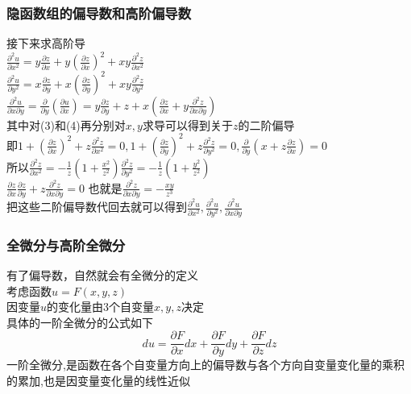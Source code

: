 \documentclass[xetex]{beamer}
\begin{document}
\begin{frame}
	\frametitle{隐函数组的偏导数和高阶偏导数}
	接下来求高阶导\\
	$\frac{\partial^2 u}{\partial x^2}=y\frac{\partial z}{\partial x}+y(\frac{\partial z}{\partial x})^2+xy\frac{\partial^2 z}{\partial x^2}$\\ \pause
	$\frac{\partial^2 u}{\partial y^2}=x\frac{\partial z}{\partial y}+x(\frac{\partial z}{\partial y})^2+xy\frac{\partial^2 z}{\partial y^2}$\\ \pause
	$\frac{\partial^2 u}{\partial x\partial y}=\frac{\partial }{\partial y}(\frac{\partial u}{\partial x})=y\frac{\partial z}{\partial y}+z+x(\frac{\partial z}{\partial x}+y\frac{\partial^2 z}{\partial x\partial y})$\\ \pause
	其中对(3)和(4)再分别对$x,y$求导可以得到关于$z$的二阶偏导\\ \pause
	即$1+(\frac{\partial z}{\partial x})^2+z\frac{\partial^2 z}{\partial x^2}=0,1+(\frac{\partial z}{\partial y})^2+z\frac{\partial^2 z}{\partial y^2}=0,\frac{\partial }{\partial y}(x+z\frac{\partial z}{\partial x})=0$\\ \pause
	所以$\frac{\partial^2 z}{\partial x^2}=-\frac{1}{z}(1+\frac{x^2}{z^2})$\quad$\frac{\partial^2 z}{\partial y^2}=-\frac{1}{z}(1+\frac{y^2}{z^2})$\\ \pause
	$\frac{\partial z}{\partial x}\frac{\partial z}{\partial y}+z\frac{\partial^2 z}{\partial x\partial y}=0$\quad
	也就是$\frac{\partial^2 z}{\partial x\partial y}=-\frac{xy}{z^3}$\\ \pause
	把这些二阶偏导数代回去就可以得到$\frac{\partial^2 u}{\partial x^2},\frac{\partial^2 u}{\partial y^2},\frac{\partial^2 u}{\partial x\partial y}$\\
	
\end{frame}


\begin{frame}
	\frametitle{全微分与高阶全微分}
	有了偏导数，自然就会有全微分的定义\\
	考虑函数$u=F(x,y,z)$\\
	因变量$u$的变化量由3个自变量$x,y,z$决定\\
	具体的一阶全微分的公式如下
	$$du=\frac{\partial F}{\partial x}dx+\frac{\partial F}{\partial y}dy+\frac{\partial F}{\partial z}dz$$
	一阶全微分,是函数在各个自变量方向上的偏导数与各个方向自变量变化量的乘积的累加,也是因变量变化量的线性近似\\
	
\end{frame}
\end{document}
